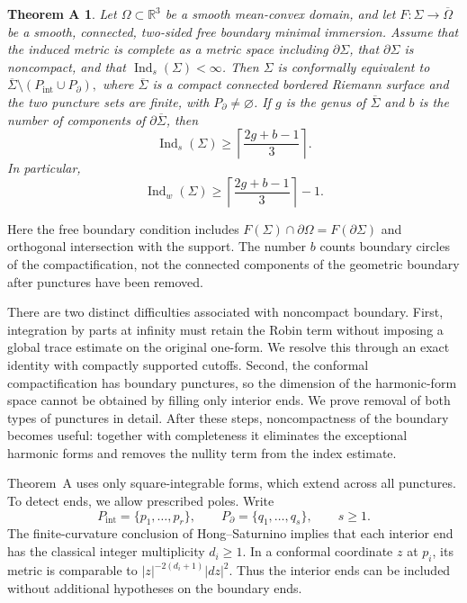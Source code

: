 \documentclass[11pt]{amsart}
\numberwithin{equation}{section}
\newtheorem*{theoremA}{Theorem A}
\theoremstyle{definition}
\theoremstyle{remark}
\newcommand{\R}{\mathbb R}
\newcommand{\Sigmabar}{\overline\Sigma}
\DeclareMathOperator{\Ind}{Ind}
\begin{document}
\begin{theoremA}\label{thm:main}
Let $\Omega\subset\R^3$ be a smooth mean-convex domain, and let
$F:\Sigma\to\overline\Omega$ be a smooth, connected, two-sided free boundary minimal immersion. Assume that the induced metric is complete as a metric space including $\partial\Sigma$, that $\partial\Sigma$ is noncompact, and that $\Ind_s(\Sigma)<\infty$. Then $\Sigma$ is conformally equivalent to
\(
\Sigmabar\setminus(P_{\mathrm{int}}\cup P_{\partial}),
\)
where $\Sigmabar$ is a compact connected bordered Riemann surface and the two puncture sets are finite, with $P_{\partial}\ne\varnothing$. If $g$ is the genus of $\Sigmabar$ and $b$ is the number of components of $\partial\Sigmabar$, then
\begin{equation}\label{eq:main}
\Ind_s(\Sigma)\ge
\left\lceil\frac{2g+b-1}{3}\right\rceil.
\end{equation}
In particular,
\[
\Ind_w(\Sigma)\ge
\left\lceil\frac{2g+b-1}{3}\right\rceil-1.
\]
\end{theoremA}

Here the free boundary condition includes
$F(\Sigma)\cap\partial\Omega=F(\partial\Sigma)$ and orthogonal intersection with the support. The number $b$ counts boundary circles of the compactification, not the connected components of the geometric boundary after punctures have been removed. 

There are two distinct difficulties associated with noncompact boundary. First, integration by parts at infinity must retain the Robin term without imposing a global trace estimate on the original one-form. We resolve this through an exact identity with compactly supported cutoffs. Second, the conformal compactification has boundary punctures, so the dimension of the harmonic-form space cannot be obtained by filling only interior ends. We prove removal of both types of punctures in detail. After these steps, noncompactness of the boundary becomes useful: together with completeness it eliminates the exceptional harmonic forms and removes the nullity term from the index estimate.

Theorem~A uses only square-integrable forms, which extend across all punctures. To detect ends, we allow prescribed poles. Write
\[
P_{\mathrm{int}}=\{p_1,\ldots,p_r\},\qquad
P_{\partial}=\{q_1,\ldots,q_s\},\qquad s\ge1.
\]
The finite-curvature conclusion of Hong--Saturnino implies that each interior end has the classical integer multiplicity $d_i\ge1$. In a conformal coordinate $z$ at $p_i$, its metric is comparable to $|z|^{-2(d_i+1)}|dz|^2$. Thus the interior ends can be included without additional hypotheses on the boundary ends.
\end{document}
